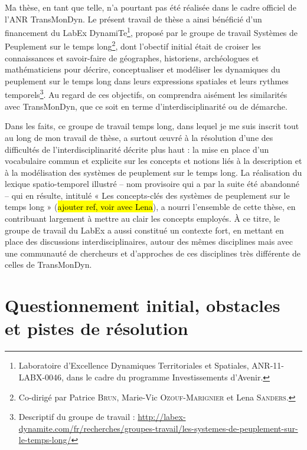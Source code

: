 Ma thèse, en tant que telle, n'a pourtant pas été réalisée dans le cadre officiel de l'ANR TransMonDyn.
Le présent travail de thèse a ainsi bénéficié d'un financement du LabEx DynamiTe\footnote{
Laboratoire d’Excellence \og Dynamiques Territoriales et Spatiales\fg{}, ANR-11-LABX-0046, dans le cadre du programme \og Investissements d’Avenir\fg{}.
}, proposé par le groupe de travail \og Systèmes de Peuplement sur le temps long\fg{}\footnote{
Co-dirigé par Patrice \textsc{Brun}, Marie-Vic \textsc{Ozouf-Marignier} et Lena \textsc{Sanders}.
}, dont l'obectif initial était de \og croiser les connaissances et savoir-faire de géographes, historiens, archéologues et mathématiciens pour décrire, conceptualiser et modéliser les dynamiques du peuplement sur le temps long dans leurs expressions spatiales et leurs rythmes temporels\fg{}\footnote{
Descriptif du groupe de travail : \href{http://labex-dynamite.com/fr/recherches/groupes-travail/les-systemes-de-peuplement-sur-le-temps-long/}{http://labex-dynamite.com/fr/recherches/groupes-travail/les-systemes-de-peuplement-sur-le-temps-long/}
}.
Au regard de ces objectifs, on comprendra aisément les similarités avec TransMonDyn, que ce soit en terme d'interdisciplinarité ou de démarche.

Dans les faits, ce groupe de travail \og temps long\fg{}, dans lequel je me suis inscrit tout au long de mon travail de thèse, a surtout œuvré à la résolution d'une des difficultés de l'interdisciplinarité décrite plus haut : la mise en place d'un vocabulaire commun et explicite sur les concepts et notions liés à la description et à la modélisation des systèmes de peuplement sur le temps long.
La réalisation du \og lexique spatio-temporel illustré\fg{} -- nom provisoire qui a par la suite été abandonné -- qui en résulte, intitulé \og « Les concepts-clés des systèmes de peuplement sur le temps long » (\hl{ajouter ref, voir avec Lena}), a nourri l'ensemble de cette thèse, en contribuant largement à mettre au clair les concepts employés.
À ce titre, le groupe de travail du LabEx a aussi constitué un contexte fort, en mettant en place des discussions interdisciplinaires, autour des mêmes disciplines mais avec une communauté de chercheurs et d'approches de ces disciplines très différente de celles de TransMonDyn.

\let\orisectionmark\sectionmark
\renewcommand\sectionmark[1]{}%
\section{Questionnement initial, obstacles et pistes de résolution}
\orisectionmark{Évolution du questionnement}
\let\sectionmark\orisectionmark

